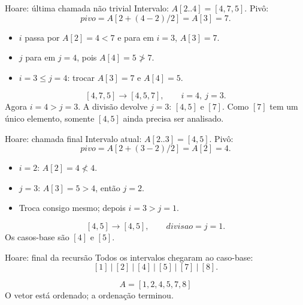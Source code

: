 \documentclass[aspectratio=169,11pt]{beamer}
\begin{document}
\begin{frame}{Hoare: última chamada não trivial}
  \small
  Intervalo: \(A[2..4]=[4,7,5]\). Pivô:
  \[
    pivo=A[2+(4-2)/2]=A[3]=7.
  \]
  \begin{itemize}
    \item \(i\) passa por \(A[2]=4<7\) e para em \(i=3\), \(A[3]=7\).
    \item \(j\) para em \(j=4\), pois \(A[4]=5\not>7\).
    \item \(i=3\leq j=4\): trocar \(A[3]=7\) e \(A[4]=5\).
  \end{itemize}
  \[
    [4,7,5]\longrightarrow[4,5,7],\qquad i=4,\ j=3.
  \]
  \scriptsize Agora \(i=4>j=3\). A divisão devolve \(j=3\): \([4,5]\) e \([7]\). Como \([7]\) tem um único elemento, somente \([4,5]\) ainda precisa ser analisado.
\end{frame}

\begin{frame}{Hoare: chamada final}
  \small
  Intervalo atual: \(A[2..3]=[4,5]\). Pivô:
  \[
    pivo=A[2+(3-2)/2]=A[2]=4.
  \]
  \begin{itemize}
    \item \(i=2\): \(A[2]=4\not<4\).
    \item \(j=3\): \(A[3]=5>4\), então \(j=2\).
    \item Troca consigo mesmo; depois \(i=3>j=1\).
  \end{itemize}
  \[
    [4,5]\longrightarrow[4,5],\qquad divisao=j=1.
  \]
  \scriptsize Os casos-base são \([4]\) e \([5]\).
\end{frame}

\begin{frame}{Hoare: final da recursão}
  \small
  Todos os intervalos chegaram ao caso-base:
  \[
    [1]\ |\ [2]\ |\ [4]\ |\ [5]\ |\ [7]\ |\ [8].
  \]
  \vspace{.35em}
  \begin{center}
  \end{center}
  \[
    \boxed{A=[1,2,4,5,7,8]}
  \]
  \scriptsize O vetor está ordenado; a ordenação terminou.
\end{frame}
\end{document}
